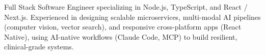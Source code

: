 \begin{onecolentry}
    Full Stack Software Engineer specializing in Node.js, TypeScript, and React / Next.js. Experienced in designing scalable microservices, multi-modal AI pipelines (computer vision, vector search), and responsive cross-platform apps (React Native), using AI-native workflows (Claude Code, MCP) to build resilient, clinical-grade systems.
\end{onecolentry}
